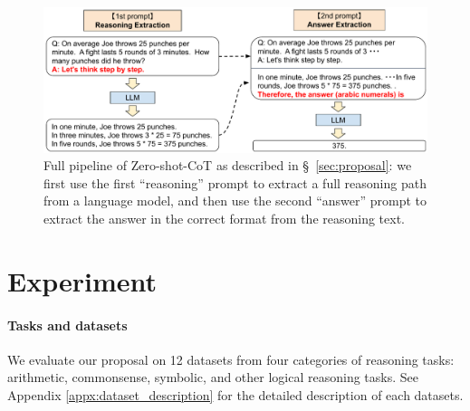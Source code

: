 \documentclass{article}
\newcommand{\mr}[1]{{\color{teal}[{#1} --MR]}}
\newcommand{\sg}[1]{{\color{orange}[{#1} --SG]}}
\newcommand{\ours}{Zero-shot-CoT\xspace}
\newcommand{\theirs}{Few-shot-CoT\xspace}
\newcommand{\theirsz}{Zero-shot\xspace}
\newcommand{\theirsf}{Few-shot\xspace}
\newcommand{\mysection}{\S\xspace}
\begin{document}
\begin{figure}[t]
  \begin{center}
   \includegraphics[width=0.99\columnwidth]{fig_overview_2}
  \end{center}
  \caption{Full pipeline of \ours as described in \mysection ~\ref{sec:proposal}: we first use the first ``reasoning'' prompt  to extract a full reasoning path from a language model, and then use the second ``answer'' prompt to extract the answer in the correct format from the reasoning text.}
  \label{fig_overview_2}
\end{figure}

%

\section{Experiment}
\label{sec:experiment}




\paragraph{Tasks and datasets}

We evaluate our proposal on 12 datasets from four categories of reasoning tasks: arithmetic, commonsense, symbolic, and other logical reasoning tasks. 
See Appendix \ref{appx:dataset_description} for the detailed description of each datasets. 
\end{document}
